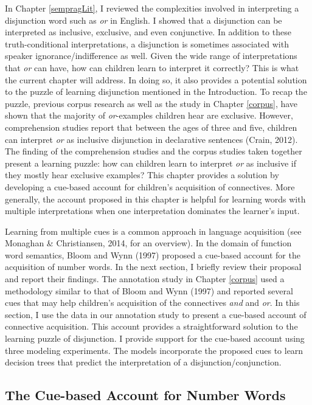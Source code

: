 \documentclass[floatsintext,man]{apa6}
\theoremstyle{definition}
\theoremstyle{definition}
\theoremstyle{definition}
\theoremstyle{remark}
\begin{document}
In Chapter \ref{sempragLit}, I reviewed the complexities involved in
interpreting a disjunction word such as \emph{or} in English. I showed
that a disjunction can be interpreted as inclusive, exclusive, and even
conjunctive. In addition to these truth-conditional interpretations, a
disjunction is sometimes associated with speaker ignorance/indifference
as well. Given the wide range of interpretations that \emph{or} can
have, how can children learn to interpret it correctly? This is what the
current chapter will address. In doing so, it also provides a potential
solution to the puzzle of learning disjunction mentioned in the
Introduction. To recap the puzzle, previous corpus research as well as
the study in Chapter \ref{corpus}, have shown that the majority of
\emph{or}-examples children hear are exclusive. However, comprehension
studies report that between the ages of three and five, children can
interpret \emph{or} as inclusive disjunction in declarative sentences
(Crain, 2012). The finding of the comprehension studies and the corpus
studies taken together present a learning puzzle: how can children learn
to interpret \emph{or} as inclusive if they mostly hear exclusive
examples? This chapter provides a solution by developing a cue-based
account for children's acquisition of connectives. More generally, the
account proposed in this chapter is helpful for learning words with
multiple interpretations when one interpretation dominates the learner's
input.

Learning from multiple cues is a common approach in language acquisition
(see Monaghan \& Christiansen, 2014, for an overview). In the domain of
function word semantics, Bloom and Wynn (1997) proposed a cue-based
account for the acquisition of number words. In the next section, I
briefly review their proposal and report their findings. The annotation
study in Chapter \ref{corpus} used a methodology similar to that of
Bloom and Wynn (1997) and reported several cues that may help children's
acquisition of the connectives \emph{and} and \emph{or}. In this
section, I use the data in our annotation study to present a cue-based
account of connective acquisition. This account provides a
straightforward solution to the learning puzzle of disjunction. I
provide support for the cue-based account using three modeling
experiments. The models incorporate the proposed cues to learn decision
trees that predict the interpretation of a disjunction/conjunction.

\subsection{The Cue-based Account for Number
Words}\label{the-cue-based-account-for-number-words}
\end{document}
